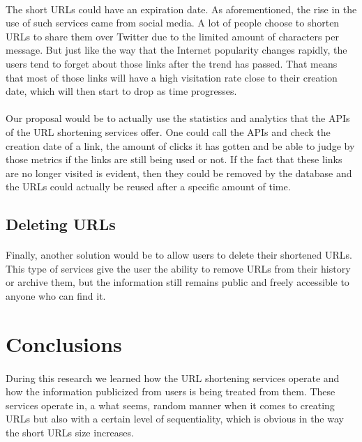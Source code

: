 \documentclass[12pt]{article}
\begin{document}
\paragraph{}
The short URLs could have an expiration date. As aforementioned, the rise in the use of such services came from social media. A lot of people choose to shorten URLs to share them over Twitter due to the limited amount of characters per message. But just like the way that the Internet popularity changes rapidly, the users tend to forget about those links after the trend has passed. That means that most of those links will have a high visitation rate close to their creation date, which will then start to drop as time progresses.

\paragraph{}
Our proposal would be to actually use the statistics and analytics that the APIs of the URL shortening services offer. One could call the APIs and check the creation date of a link, the amount of clicks it has gotten and be able to judge by those metrics if the links are still being used or not. If the fact that these links are no longer visited is evident, then they could be removed by the database and the URLs could actually be reused after a specific amount of time.

\subsection{Deleting URLs}

\paragraph{}
Finally, another solution would be to allow users to delete their shortened URLs. This type of services give the user the ability to remove URLs from their history or archive them, but the information still remains public and freely accessible to anyone who can find it.

\section{Conclusions}

\paragraph{}
During this research we learned how the URL shortening services operate and how the information publicized from users is being treated from them. These services operate in, a what seems, random manner when it comes to creating URLs but also with a certain level of sequentiality, which is obvious in the way the short URLs size increases.
\end{document}
